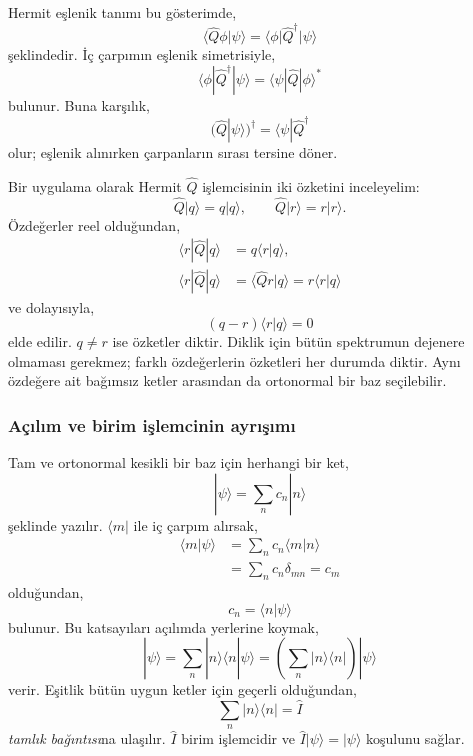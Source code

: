 \documentclass[00_kitap.tex]{subfiles}
\begin{document}
Hermit eşlenik tanımı bu gösterimde,
\begin{equation}
 \langle\hat Q\phi|\psi\rangle
 =\langle\phi|\hat Q^\dagger|\psi\rangle
\end{equation}
şeklindedir. İç çarpımın eşlenik simetrisiyle,
\begin{equation}
 \boxed{\langle\phi|\hat Q^\dagger|\psi\rangle
       =\langle\psi|\hat Q|\phi\rangle^*}
 \label{eq:06_hermit_eslenik}
\end{equation}
bulunur. Buna karşılık,
\begin{equation}
 (\hat Q|\psi\rangle)^\dagger
 =\langle\psi|\hat Q^\dagger
\end{equation}
olur; eşlenik alınırken çarpanların sırası tersine döner.

Bir uygulama olarak Hermit $\hat Q$ işlemcisinin iki özketini
inceleyelim:
\begin{equation}
 \hat Q|q\rangle=q|q\rangle,\qquad
 \hat Q|r\rangle=r|r\rangle.
\end{equation}
Özdeğerler reel olduğundan,
\begin{align}
 \langle r|\hat Q|q\rangle&=q\langle r|q\rangle,\\
 \langle r|\hat Q|q\rangle
 &=\langle\hat Qr|q\rangle=r\langle r|q\rangle
\end{align}
ve dolayısıyla,
\begin{equation}
 (q-r)\langle r|q\rangle=0
\end{equation}
elde edilir. $q\ne r$ ise özketler diktir. Diklik için bütün
spektrumun dejenere olmaması gerekmez; farklı özdeğerlerin
özketleri her durumda diktir. Aynı özdeğere ait bağımsız ketler
arasından da ortonormal bir baz seçilebilir.

\subsubsection{Açılım ve birim işlemcinin ayrışımı}

Tam ve ortonormal kesikli bir baz için herhangi bir ket,
\begin{equation}
 |\psi\rangle=\sum_n c_n|n\rangle
 \label{eq:06_ket_acilim}
\end{equation}
şeklinde yazılır. $\langle m|$ ile iç çarpım alırsak,
\begin{align}
 \langle m|\psi\rangle
 &=\sum_n c_n\langle m|n\rangle\\
 &=\sum_n c_n\delta_{mn}=c_m
\end{align}
olduğundan,
\begin{equation}
 \boxed{c_n=\langle n|\psi\rangle}
 \label{eq:06_katsayi}
\end{equation}
bulunur. Bu katsayıları açılımda yerlerine koymak,
\begin{equation}
 |\psi\rangle=\sum_n|n\rangle\langle n|\psi\rangle
 =\left(\sum_n|n\rangle\langle n|\right)|\psi\rangle
\end{equation}
verir. Eşitlik bütün uygun ketler için geçerli olduğundan,
\begin{equation}
 \boxed{\sum_n|n\rangle\langle n|=\hat I}
 \label{eq:06_birim}
\end{equation}
\emph{tamlık bağıntısı}na ulaşılır. $\hat I$ birim işlemcidir ve
$\hat I|\psi\rangle=|\psi\rangle$ koşulunu sağlar.
\end{document}

